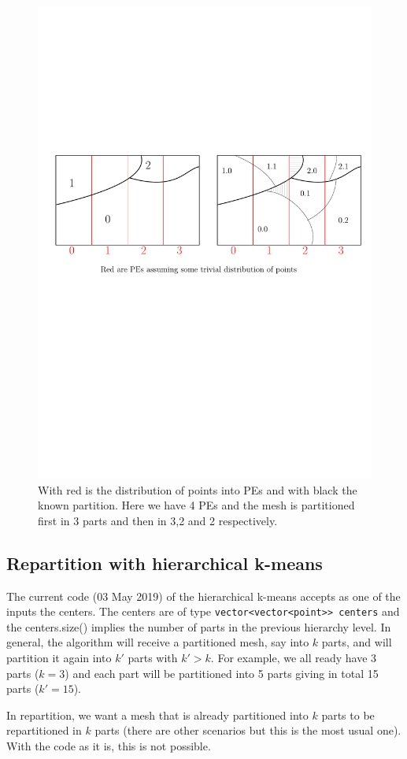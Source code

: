 \documentclass[a4paper,10pt]{article}
\begin{document}
\begin{figure}
\includegraphics[scale=0.7]{heterog_tree_part_with_PEs}
\caption{With red is the distribution of points into PEs and with black the known partition.
Here we have 4 PEs and the mesh is partitioned first in 3 parts and then in 3,2 and 2 respectively.}
\label{fig:heterog_withPEs}
\end{figure}


\subsection*{Repartition with hierarchical k-means}

The current code (03 May 2019) of the hierarchical k-means accepts as one of the inputs the centers.
The centers are of type \texttt{vector<vector<point>> centers} and the centers.size() implies
the number of parts in the previous hierarchy level. In general, the algorithm will receive
a partitioned mesh, say into $k$ parts, and will partition it again into $k'$ parts with $k'>k$.
For example, we all ready have 3 parts ($k=3$) and each part will be partitioned into 5 parts
giving in total 15 parts ($k'=15$). 

In repartition, we want a mesh that is already partitioned into $k$ parts to be repartitioned in $k$
parts (there are other scenarios but this is the most usual one). With the code as it is, this is not
possible. 
\end{document}
